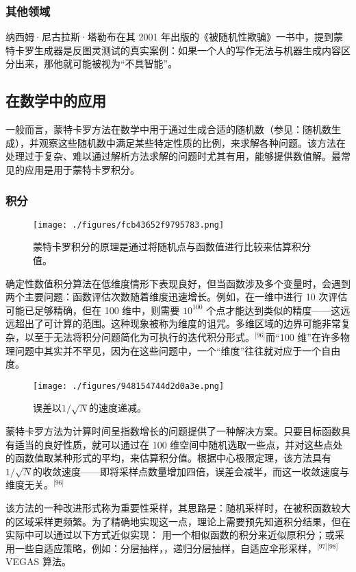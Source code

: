\subsubsection{其他领域}
纳西姆·尼古拉斯·塔勒布在其 2001 年出版的《被随机性欺骗》一书中，提到蒙特卡罗生成器是反图灵测试的真实案例：如果一个人的写作无法与机器生成内容区分出来，那他就可能被视为“不具智能”。
\subsection{在数学中的应用}
一般而言，蒙特卡罗方法在数学中用于通过生成合适的随机数（参见：随机数生成），并观察这些随机数中满足某些特定性质的比例，来求解各种问题。该方法在处理过于复杂、难以通过解析方法求解的问题时尤其有用，能够提供数值解。最常见的应用是用于蒙特卡罗积分。
\subsubsection{积分}
\begin{figure}[ht]
\centering
\texttt{[image: ./figures/fcb43652f9795783.png]}
\caption{蒙特卡罗积分的原理是通过将随机点与函数值进行比较来估算积分值。} \label{fig_MTKL_6}
\end{figure}
确定性数值积分算法在低维度情形下表现良好，但当函数涉及多个变量时，会遇到两个主要问题：函数评估次数随着维度迅速增长。例如，在一维中进行 10 次评估可能已足够精确，但在 100 维中，则需要 $10^{100}$ 个点才能达到类似的精度——这远远超出了可计算的范围。这种现象被称为维度的诅咒。多维区域的边界可能非常复杂，以至于无法将积分问题简化为可执行的迭代积分形式。\(^\text{[96]}\)而“100 维”在许多物理问题中其实并不罕见，因为在这些问题中，一个“维度”往往就对应于一个自由度。
\begin{figure}[ht]
\centering
\texttt{[image: ./figures/948154744d2d0a3e.png]}
\caption{误差以$1/\sqrt{N}$的速度递减。} \label{fig_MTKL_7}
\end{figure}
蒙特卡罗方法为计算时间呈指数增长的问题提供了一种解决方案。只要目标函数具有适当的良好性质，就可以通过在 100 维空间中随机选取一些点，并对这些点处的函数值取某种形式的平均，来估算积分值。根据中心极限定理，该方法具有$1/\sqrt{N}$的收敛速度——即将采样点数量增加四倍，误差会减半，而这一收敛速度与维度无关。\(^\text{[96]}\)

该方法的一种改进形式称为重要性采样，其思路是：随机采样时，在被积函数较大的区域采样更频繁。为了精确地实现这一点，理论上需要预先知道积分结果，但在实际中可以通过以下方式近似实现：
用一个相似函数的积分来近似原积分；或采用一些自适应策略，例如：分层抽样，，递归分层抽样，自适应伞形采样，\(^\text{[97][98]}\)VEGAS 算法。

